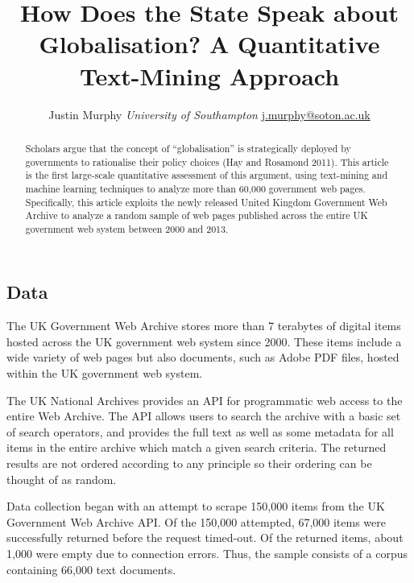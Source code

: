 \documentclass[11pt,article,oneside]{memoir}
\title{How Does the State Speak about Globalisation? A Quantitative Text-Mining
Approach}
\author{\Large Justin Murphy\vspace{0.05in} \newline\normalsize\emph{University of Southampton} \newline\footnotesize \url{j.murphy@soton.ac.uk}\vspace*{0.2in}\newline }
\date{}
\begin{document}
  
\setsansfont[Mapping=tex-text]{Gill Sans} 
\setmonofont[Mapping=tex-text,Scale=0.8]{Consolas}
\pagestyle{kjh}

\singlespacing


\maketitle



\vspace{-4ex}
\begin{abstract}

\noindent Scholars argue that the concept of ``globalisation'' is strategically
deployed by governments to rationalise their policy choices (Hay and
Rosamond 2011). This article is the first large-scale quantitative
assessment of this argument, using text-mining and machine learning
techniques to analyze more than 60,000 government web pages.
Specifically, this article exploits the newly released United Kingdom
Government Web Archive to analyze a random sample of web pages published
across the entire UK government web system between 2000 and 2013.

\end{abstract}

\newpage


\subsection{Data}\label{data}

The UK Government Web Archive stores more than 7 terabytes of digital
items hosted across the UK government web system since 2000. These items
include a wide variety of web pages but also documents, such as Adobe
PDF files, hosted within the UK government web system.

The UK National Archives provides an API for programmatic web access to
the entire Web Archive. The API allows users to search the archive with
a basic set of search operators, and provides the full text as well as
some metadata for all items in the entire archive which match a given
search criteria. The returned results are not ordered according to any
principle so their ordering can be thought of as random.

Data collection began with an attempt to scrape 150,000 items from the
UK Government Web Archive API. Of the 150,000 attempted, 67,000 items
were successfully returned before the request timed-out. Of the returned
items, about 1,000 were empty due to connection errors. Thus, the sample
consists of a corpus containing 66,000 text documents.
\end{document}
